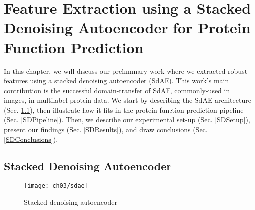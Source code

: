 %
%
%
%
%

\chapter[Stacked Denoising Autoencoder for Protein Function Prediction]{
    \huge
    Feature Extraction using a Stacked Denoising Autoencoder for Protein
    Function Prediction
}
\label{SDAEChapter}

\par In this chapter, we will discuss our preliminary work where we extracted
robust features using a stacked denoising autoencoder (SdAE). This work's main
contribution is the successful domain-transfer of SdAE, commonly-used in
images, in multilabel protein data. We start by describing the SdAE
architecture (Sec. \ref{SDArchitecture}), then illustrate how it fits in the
protein function prediction pipeline (Sec.  \ref{SDPipeline}). Then, we
describe our experimental set-up (Sec.  \ref{SDSetup}), present our findings
(Sec. \ref{SDResults}), and draw conclusions (Sec. \ref{SDConclusions}).

\section{Stacked Denoising Autoencoder}
\label{SDArchitecture}

\begin{wrapfigure}{r}{0.53\textwidth}
  \centering
  \texttt{[image: ch03/sdae]}
  \caption{Stacked denoising autoencoder}
  \label{schema:sdae}
\end{wrapfigure}

